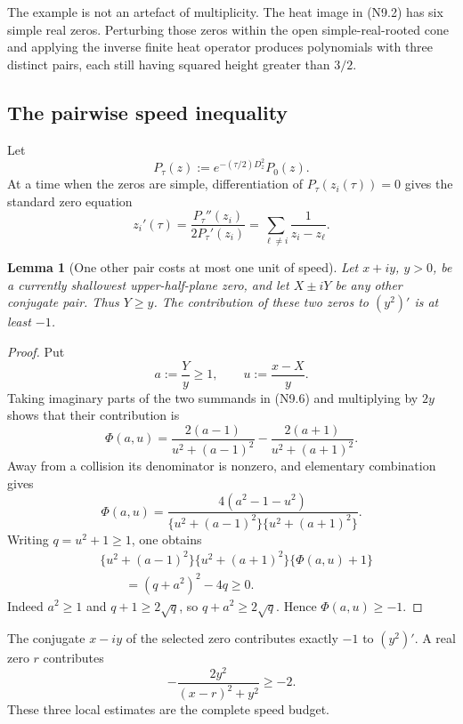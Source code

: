 \documentclass[11pt]{article}
\newtheorem{lemma}[theorem]{Lemma}
\theoremstyle{definition}
\theoremstyle{remark}
\begin{document}
The example is not an artefact of multiplicity.  The heat image in
\textup{(N9.2)} has six simple real zeros.  Perturbing those zeros within
the open simple-real-rooted cone and applying the inverse finite heat
operator produces polynomials with three distinct pairs, each still having
squared height greater than \(3/2\).

\subsection{The pairwise speed inequality}

Let
\[
 P_\tau(z):=e^{-(\tau/2)D_z^2}P_0(z).
 \tag{N9.5}
\]
At a time when the zeros are simple, differentiation of
\(P_\tau(z_i(\tau))=0\) gives the standard zero equation
\[
 z_i'(\tau)
 =\frac{P_\tau''(z_i)}{2P_\tau'(z_i)}
 =\sum_{\ell\ne i}\frac1{z_i-z_\ell}.
 \tag{N9.6}
\]

\begin{lemma}[One other pair costs at most one unit of speed]
\label{lem:f2v9-pair-speed}
Let \(x+iy\), \(y>0\), be a currently shallowest upper-half-plane zero,
and let \(X\pm iY\) be any other conjugate pair.  Thus \(Y\ge y\).
The contribution of these two zeros to \((y^2)'\) is at least \(-1\).
\end{lemma}

\begin{proof}
Put
\[
 a:=\frac{Y}{y}\ge1,
 \qquad
 u:=\frac{x-X}{y}.
 \tag{N9.7}
\]
Taking imaginary parts of the two summands in \textup{(N9.6)} and
multiplying by \(2y\) shows that their contribution is
\[
 \Phi(a,u)
 =\frac{2(a-1)}{u^2+(a-1)^2}
  -\frac{2(a+1)}{u^2+(a+1)^2}.
 \tag{N9.8}
\]
Away from a collision its denominator is nonzero, and elementary
combination gives
\[
 \Phi(a,u)
 =\frac{4(a^2-1-u^2)}
 {\{u^2+(a-1)^2\}\{u^2+(a+1)^2\}}.
 \tag{N9.9}
\]
Writing \(q=u^2+1\ge1\), one obtains
\[
\begin{aligned}
 &\{u^2+(a-1)^2\}\{u^2+(a+1)^2\}
       \{\Phi(a,u)+1\}\\
 &\qquad=(q+a^2)^2-4q\ge0.
\end{aligned}
\tag{N9.10}
\]
Indeed \(a^2\ge1\) and \(q+1\ge2\sqrt q\), so
\(q+a^2\ge2\sqrt q\).  Hence \(\Phi(a,u)\ge-1\).
\end{proof}

The conjugate \(x-iy\) of the selected zero contributes exactly \(-1\) to
\((y^2)'\).  A real zero \(r\) contributes
\[
 -\frac{2y^2}{(x-r)^2+y^2}\ge-2.
 \tag{N9.11}
\]
These three local estimates are the complete speed budget.
\end{document}
